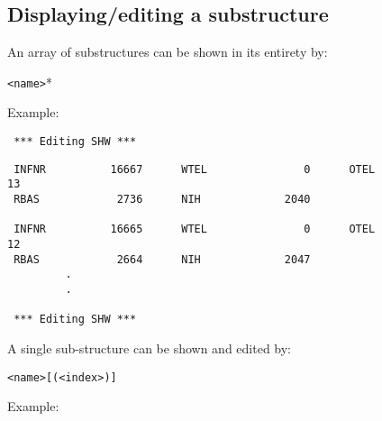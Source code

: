 \subsection{ Displaying/editing a substructure} 

	An array of substructures can be shown in its entirety by: 

	\verb/<name>/* 

\noindent Example: 

%
\spbegin %
\svbegin \begin{verbatim} 
 *** Editing SHW *** 
\end{verbatim} 
%
%
\svbegin \begin{verbatim} 
 INFNR          16667      WTEL               0      OTEL              13
 RBAS            2736      NIH             2040

 INFNR          16665      WTEL               0      OTEL              12
 RBAS            2664      NIH             2047
		 .
		 .

 *** Editing SHW *** 
\end{verbatim}\svend 
{} 
\spend %


\noindent A single sub-structure can be shown and edited by: 

	\verb/<name>[(<index>)]/ 

\noindent Example: 


